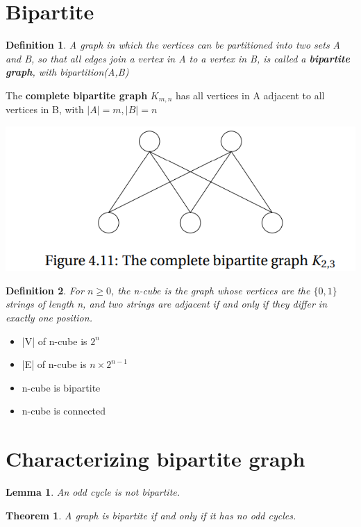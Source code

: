 \documentclass[10pt, a4paper]{article}
\newtheorem*{thm}{Theorem}
\newtheorem*{defn}{Definition}
\newtheorem*{lemma}{Lemma}
\begin{document}
\section{Bipartite}
\begin{defn}
    A graph in which the vertices can be partitioned into two sets A and B, so that all edges join a vertex in A to a vertex in B, is called a \textbf{bipartite graph}, with bipartition(A,B)
\end{defn}
\begin{term}
    The \textbf{complete bipartite graph} $K_{m,n}$ has all vertices in A adjacent to all vertices in B, with $|A| = m, |B| = n$ 
\end{term}
\includegraphics{k2-3.png}
\begin{defn}
    For $n\ge0$, the n-cube is the graph whose vertices are the $\{0,1\}$ strings of length n, and two strings are adjacent if and only if they differ in exactly one position.
\end{defn}
\begin{term}
\begin{itemize}
    \item |V| of n-cube is $2^n$ 
    \item |E| of n-cube is $n\times2^{n-1}$
    \item n-cube is bipartite
    \item n-cube is connected
\end{itemize}
\end{term}
\section{Characterizing bipartite graph}
\begin{lemma}
    An odd cycle is not bipartite.
\end{lemma}
\begin{thm}
    A graph is bipartite if and only if it has no odd cycles.
\end{thm}
\end{document}
